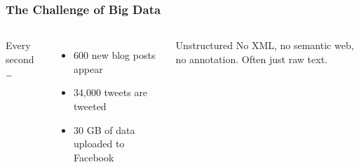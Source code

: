 \documentclass[compress]{beamer}
\begin{document}
\begin{frame}[plain]
\end{frame}


\begin{frame}
\frametitle{The Challenge of Big Data}

\begin{columns}


Every second \dots
\begin{itemize}
  \item 600 new blog posts appear
  \item 34,000 tweets are tweeted
  \item 30 GB of data uploaded to Facebook
\end{itemize}
\pause

\begin{block}{Unstructured}
  No XML, no semantic web, no annotation.  Often just raw text.
\end{block}



\end{columns}

\end{frame}
\end{document}
